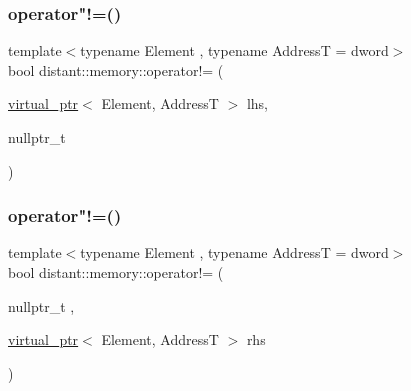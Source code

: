 \mbox{\label{namespacedistant_1_1memory_a70bc692ecf97f1b944d73cb9499d5afd}} 
\subsubsection{\texorpdfstring{operator"!=()}{operator!=()}\hspace{0.1cm}{\footnotesize\ttfamily [1/2]}}
{\footnotesize\ttfamily template$<$typename Element , typename AddressT  = dword$>$ \\
bool distant\+::memory\+::operator!= (\begin{DoxyParamCaption}\item[{\mbox{\hyperlink{classdistant_1_1memory_1_1virtual__ptr}{virtual\+\_\+ptr}}$<$ Element, AddressT $>$}]{lhs,  }\item[{nullptr\+\_\+t}]{ }\end{DoxyParamCaption})}

\mbox{\label{namespacedistant_1_1memory_a94b18e6bb8f8d8d45be25433fa3f3549}} 
\subsubsection{\texorpdfstring{operator"!=()}{operator!=()}\hspace{0.1cm}{\footnotesize\ttfamily [2/2]}}
{\footnotesize\ttfamily template$<$typename Element , typename AddressT  = dword$>$ \\
bool distant\+::memory\+::operator!= (\begin{DoxyParamCaption}\item[{nullptr\+\_\+t}]{,  }\item[{\mbox{\hyperlink{classdistant_1_1memory_1_1virtual__ptr}{virtual\+\_\+ptr}}$<$ Element, AddressT $>$}]{rhs }\end{DoxyParamCaption})}

\mbox{\label{namespacedistant_1_1memory_a86dd0cf939f40576160089daa28b3e3f}} 
